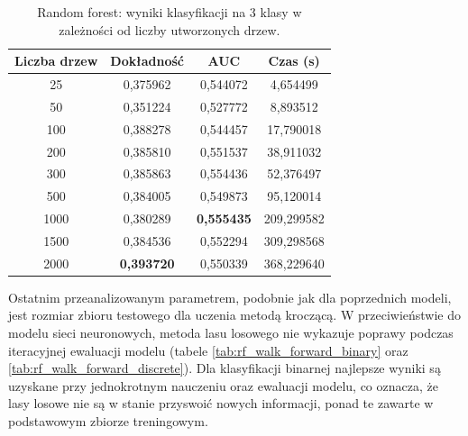 \documentclass[a4paper, twoside, 11pt, openright]{article}
\begin{document}
\begin{table}[H]
    \centering
    \begin{tabular}{|c|c|c|c|}
    \hline
        \textbf{Liczba drzew} & \textbf{Dokładność} & \textbf{AUC} & \textbf{Czas (s)} \\ \hline
25         &  0,375962 &  0,544072 &    4,654499 \\ \hline
50         &  0,351224 &  0,527772 &    8,893512 \\ \hline
100       &  0,388278 &  0,544457 &   17,790018 \\ \hline
200        &  0,385810 &  0,551537 &   38,911032 \\ \hline
300        &  0,385863 &  0,554436 &   52,376497 \\ \hline
500        &  0,384005 &  0,549873 &   95,120014 \\ \hline
1000       &  0,380289 &  \textbf{0,555435} &  209,299582 \\ \hline
1500       &  0,384536 &  0,552294 &  309,298568 \\ \hline
2000      &  \textbf{0,393720} &  0,550339 &  368,229640 \\ \hline
    \end{tabular}
    \caption{Random forest: wyniki klasyfikacji na 3 klasy w zależności od liczby utworzonych drzew.}
    \label{tab:rf_estimators_discrete}
\end{table}

Ostatnim przeanalizowanym parametrem, podobnie jak dla poprzednich modeli, jest rozmiar zbioru testowego dla uczenia metodą kroczącą. W przeciwieństwie do modelu sieci neuronowych, metoda lasu losowego nie wykazuje poprawy podczas iteracyjnej ewaluacji modelu (tabele \ref{tab:rf_walk_forward_binary} oraz \ref{tab:rf_walk_forward_discrete}). Dla klasyfikacji binarnej najlepsze wyniki są uzyskane przy jednokrotnym nauczeniu oraz ewaluacji modelu, co oznacza, że lasy losowe nie są w stanie przyswoić nowych informacji, ponad te zawarte w podstawowym zbiorze treningowym.
\end{document}
